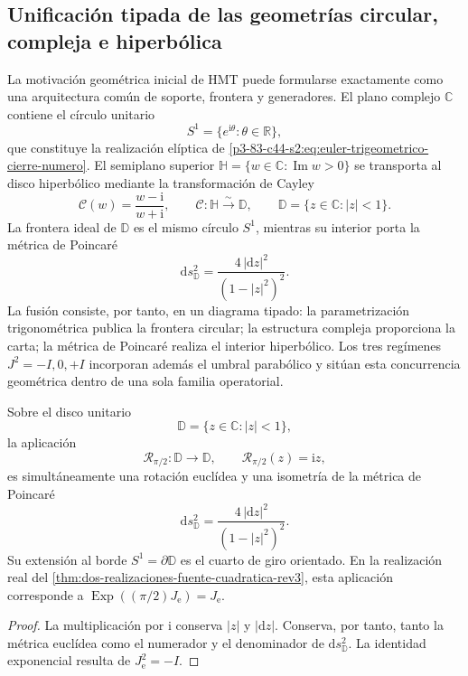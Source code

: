 \subsection{Unificación tipada de las geometrías circular, compleja e hiperbólica}
\label{p3-83-c44-s2:sec:unificacion-compleja-circular-hiperbolica-numero}

La motivación geométrica inicial de HMT puede formularse exactamente como una
arquitectura común de soporte, frontera y generadores. El plano complejo
\(\mathbb C\) contiene el círculo unitario
\[
 S^1=\{e^{\mathrm i\theta}:\theta\in\mathbb R\},
\]
que constituye la realización elíptica de
\eqref{p3-83-c44-s2:eq:euler-trigeometrico-cierre-numero}. El semiplano superior
\(\mathbb H=\{w\in\mathbb C:\operatorname{Im}w>0\}\) se transporta al disco
hiperbólico mediante la transformación de Cayley
\[
 \mathcal C(w)=\frac{w-\mathrm i}{w+\mathrm i},
 \qquad
 \mathcal C:\mathbb H\xrightarrow{\sim}\mathbb D,
 \qquad
 \mathbb D=\{z\in\mathbb C:|z|<1\}.
\]
La frontera ideal de \(\mathbb D\) es el mismo círculo \(S^1\), mientras su
interior porta la métrica de Poincaré
\[
 \mathrm ds_{\mathbb D}^2
 =\frac{4\,|\mathrm dz|^2}{(1-|z|^2)^2}.
\]
La fusión consiste, por tanto, en un diagrama tipado: la parametrización
trigonométrica publica la frontera circular; la estructura compleja
proporciona la carta; la métrica de Poincaré realiza el interior hiperbólico.
Los tres regímenes \(J^2=-I,0,+I\) incorporan además el umbral parabólico y
sitúan esta concurrencia geométrica dentro de una sola familia operatorial.

\begin{proposition}
\label{p3-83-c44-s2:prop:cuarto-giro-poincare-rev3}
Sobre el disco unitario
\[
 \mathbb D=\{z\in\mathbb C:|z|<1\},
\]
la aplicación
\[
 \mathcal R_{\pi/2}:\mathbb D\longrightarrow\mathbb D,
 \qquad
 \mathcal R_{\pi/2}(z)=\mathrm i z,
\]
es simultáneamente una rotación euclídea y una isometría de la métrica de
Poincaré
\[
 \mathrm ds_{\mathbb D}^{2}
 =\frac{4\,|\mathrm dz|^2}{(1-|z|^2)^2}.
\]
Su extensión al borde \(S^1=\partial\mathbb D\) es el cuarto de giro
orientado. En la realización real del
\cref{thm:dos-realizaciones-fuente-cuadratica-rev3}, esta aplicación
corresponde a
\(\operatorname{Exp}((\pi/2)J_{\mathrm e})=J_{\mathrm e}\).
\end{proposition}

\begin{proof}
La multiplicación por \(\mathrm i\) conserva \(|z|\) y
\(|\mathrm dz|\). Conserva, por tanto, tanto la métrica euclídea como el
numerador y el denominador de \(\mathrm ds_{\mathbb D}^{2}\). La identidad
exponencial resulta de \(J_{\mathrm e}^2=-I\).
\end{proof}


